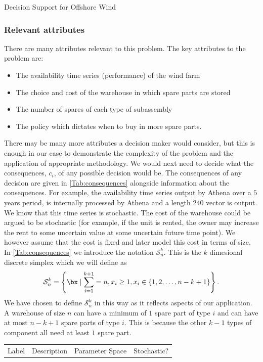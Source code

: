 \begin{chapter}{Decision Support for Offshore Wind \label{Ch:ds-for-ow}}
\subsubsection{Relevant attributes}

There are many attributes relevant to this problem. The key attributes to the problem are:
\begin{itemize}
  \item The availability time series (performance) of the wind farm
  \item The choice and cost of the warehouse in which spare parts are stored
  \item The number of spares of each type of subassembly
  \item The policy which dictates when to buy in more spare parts.
\end{itemize}
There may be many more attributes a decision maker would consider, but this is enough in our case to demonstrate the complexity of the problem and the application of appropriate methodology. We would next need to decide what the consequences, $c_i$, of any possible decision would be. The consequences of any decision are given in \cref{Tab:consequences} alongside information about the consequences. For example, the availability time series output by Athena over a $5$ years period, is internally processed by Athena and a length $240$ vector is output. We know that this time series is stochastic. The cost of the warehouse could be argued to be stochastic (for example, if the unit is rented, the owner may increase the rent to some uncertain value at some uncertain future time point). We however assume that the cost is fixed and later model this cost in terms of size. In \cref{Tab:consequences} we introduce the notation $\mathcal{S}^k_n$. This is the $k$ dimesional discrete simplex which we will define as
\begin{equation}
  \mathcal{S}^k_n = \left\{\bx \mid \sum_{i=1}^{k+1} = n, x_i \geq 1, x_i \in \{1, 2, \ldots, n-k+1\} \right\}.
\end{equation}
We have chosen to define $\mathcal{S}^k_n$ in this way as it reflects aspects of our application. A warehouse of size $n$ can have a minimum of $1$ spare part of type $i$ and can have at most $n-k+1$ spare parts of type $i$. This is because the other $k-1$ types of component all need at least $1$ spare part.
\begin{table}[H]
	\centering
	\begin{tabular}{llrl}
		\toprule
    Label & Description & Parameter Space & Stochastic?\\\cmidrule{1-4}

\end{tabular}
\end{table}
\end{chapter}
